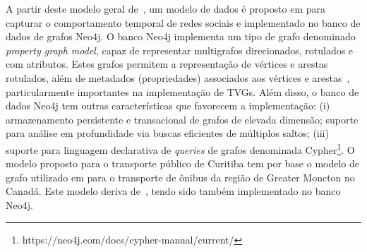 \textcolor{courb2020}{
A partir deste modelo geral de~\cite{sant:12}, um modelo de dados é proposto em \cite{cat:13} para capturar o comportamento temporal de redes sociais e implementado no banco de dados de grafos Neo4j. O banco Neo4j implementa um tipo de grafo denominado \emph{property graph model}, capaz de representar multigrafos direcionados, rotulados e com atributos. Estes grafos permitem a representação de vértices e arestas rotulados, além de metadados (propriedades) associados aos vértices e arestas~\cite{rod:10}, particularmente importantes na implementação de TVGs. Além disso, o banco de dados Neo4j tem outras características que favorecem a implementação: (i) armazenamento persistente e transacional de grafos de elevada dimensão; suporte para análise em profundidade via buscas eficientes de múltiplos saltos; (iii) suporte para linguagem declarativa de \emph{queries} de grafos denominada Cypher\footnote{https://neo4j.com/docs/cypher-manual/current/}.
}
\textcolor{courb2020}{
O modelo proposto para o transporte público de Curitiba tem por base o modelo de grafo utilizado em \cite{wach:19} para o transporte de ônibus da região de Greater Moncton no Canadá. Este modelo deriva de~\cite{cat:13}, tendo sido também implementado no banco Neo4j.
}

